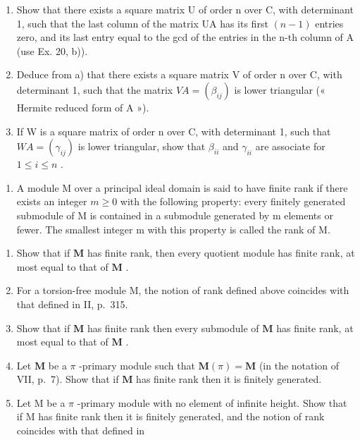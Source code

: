 \begin{enumerate}
\def\labelenumi{\alph{enumi})}
\item
  Show that there exists a square matrix U of order n over C, with determinant 1, such that the last column of the matrix UA has its first \((n-1)\) entries zero, and its last entry equal to the gcd of the entries in the n-th column of A (use Ex. 20, b)).
\item
  Deduce from a) that there exists a square matrix V of order n over C, with determinant 1, such that the matrix \(VA = (\beta_{ij})\) is lower triangular (« Hermite reduced form of A »).
\item
  If W is a square matrix of order n over C, with determinant 1, such that \(WA = (\gamma_{ij})\) is lower triangular, show that \(\beta_{ii}\) and \(\gamma_{ii}\) are associate for \(1 \leqslant i \leqslant n\) .
\end{enumerate}

\begin{enumerate}
\def\labelenumi{\arabic{enumi})}
\setcounter{enumi}{21}
\tightlist
\item
  A module M over a principal ideal domain is said to have finite rank if there exists an integer \(m \geqslant 0\) with the following property: every finitely generated submodule of M is contained in a submodule generated by m elements or fewer. The smallest integer m with this property is called the rank of M.
\end{enumerate}

\begin{enumerate}
\def\labelenumi{\alph{enumi})}
\item
  Show that if \(\mathbf{M}\) has finite rank, then every quotient module has finite rank, at most equal to that of \(\mathbf{M}\) .
\item
  For a torsion-free module M, the notion of rank defined above coincides with that defined in II, p.~315.
\item
  Show that if \(\mathbf{M}\) has finite rank then every submodule of \(\mathbf{M}\) has finite rank, at most equal to that of \(\mathbf{M}\) .
\item
  Let \(\mathbf{M}\) be a \(\pi\) -primary module such that \(\mathbf{M}(\pi) = \mathbf{M}\) (in the notation of VII, p.~7). Show that if \(\mathbf{M}\) has finite rank then it is finitely generated.
\item
  Let M be a \(\pi\) -primary module with no element of infinite height. Show that if M has finite rank then it is finitely generated, and the notion of rank coincides with that defined in
\end{enumerate}

